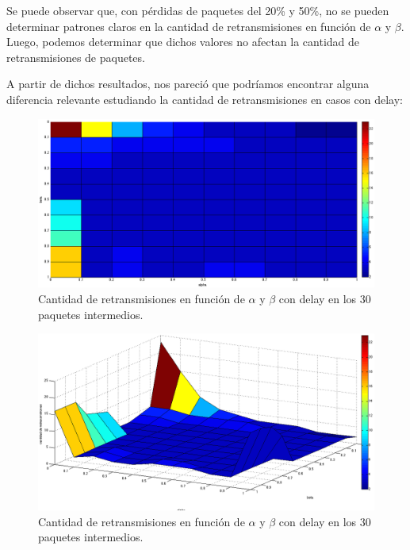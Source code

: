 \documentclass[10pt, a4paper]{article}
\begin{document}
Se puede observar que, con pérdidas de paquetes del 20\% y 50\%, no se pueden determinar patrones claros en la cantidad de retransmisiones en función de $\alpha$ y $\beta$. Luego, podemos determinar que dichos valores no afectan la cantidad de retransmisiones de paquetes.

A partir de dichos resultados, nos pareció que podríamos encontrar alguna diferencia relevante estudiando la cantidad de retransmisiones en casos con delay:

\begin{figure}[H]
\begin{center}
\includegraphics[width=17cm]{delay-30F30L-ret.png}
\caption{Cantidad de retransmisiones en función de $\alpha$ y $\beta$ con delay en los 30 paquetes intermedios.}
\end{center}
\end{figure}

\begin{figure}[H]
\begin{center}
\includegraphics[width=17cm]{delay-30F30L-ret-costado.png}
\caption{Cantidad de retransmisiones en función de $\alpha$ y $\beta$ con delay en los 30 paquetes intermedios.}
\end{center}
\end{figure}
\end{document}
